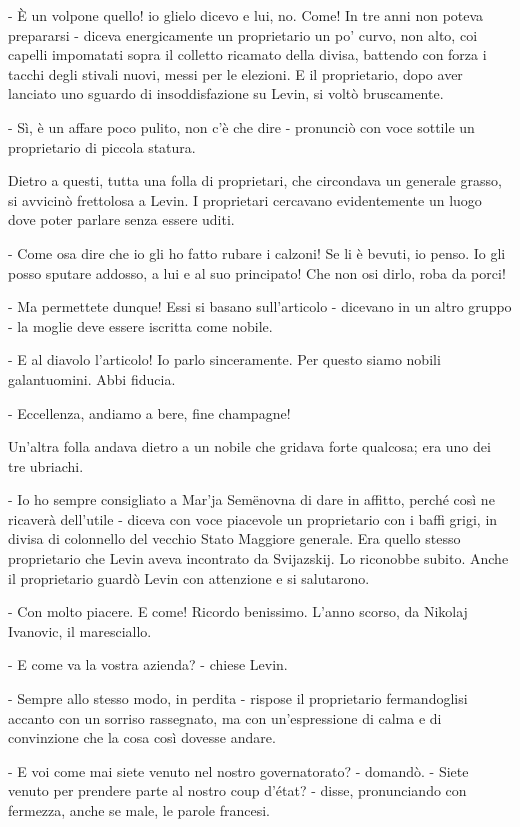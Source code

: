 - È un volpone quello! io glielo dicevo e lui, no. Come! In tre anni non poteva prepararsi - diceva energicamente un proprietario un po' curvo, non alto, coi capelli impomatati sopra il colletto ricamato della divisa, battendo con forza i tacchi degli stivali nuovi, messi per le elezioni. E il proprietario, dopo aver lanciato uno sguardo di insoddisfazione su Levin, si voltò bruscamente. 

- Sì, è un affare poco pulito, non c'è che dire - pronunciò con voce sottile un proprietario di piccola statura. 

Dietro a questi, tutta una folla di proprietari, che circondava un generale grasso, si avvicinò frettolosa a Levin. I proprietari cercavano evidentemente un luogo dove poter parlare senza essere uditi. 

- Come osa dire che io gli ho fatto rubare i calzoni! Se li è bevuti, io penso. Io gli posso sputare addosso, a lui e al suo principato! Che non osi dirlo, roba da porci! 

- Ma permettete dunque! Essi si basano sull'articolo - dicevano in un altro gruppo - la moglie deve essere iscritta come nobile. 

- E al diavolo l'articolo! Io parlo sinceramente. Per questo siamo nobili galantuomini. Abbi fiducia. 

- Eccellenza, andiamo a bere, fine champagne! 

Un'altra folla andava dietro a un nobile che gridava forte qualcosa; era uno dei tre ubriachi. 

- Io ho sempre consigliato a Mar'ja Semënovna di dare in affitto, perché così ne ricaverà dell'utile - diceva con voce piacevole un proprietario con i baffi grigi, in divisa di colonnello del vecchio Stato Maggiore generale. Era quello stesso proprietario che Levin aveva incontrato da Svijazskij. Lo riconobbe subito. Anche il proprietario guardò Levin con attenzione e si salutarono. 

- Con molto piacere. E come! Ricordo benissimo. L'anno scorso, da Nikolaj Ivanovic, il maresciallo. 

- E come va la vostra azienda? - chiese Levin. 

- Sempre allo stesso modo, in perdita - rispose il proprietario fermandoglisi accanto con un sorriso rassegnato, ma con un'espressione di calma e di convinzione che la cosa così dovesse andare. 

- E voi come mai siete venuto nel nostro governatorato? - domandò. - Siete venuto per prendere parte al nostro coup d'état? - disse, pronunciando con fermezza, anche se male, le parole francesi. 

